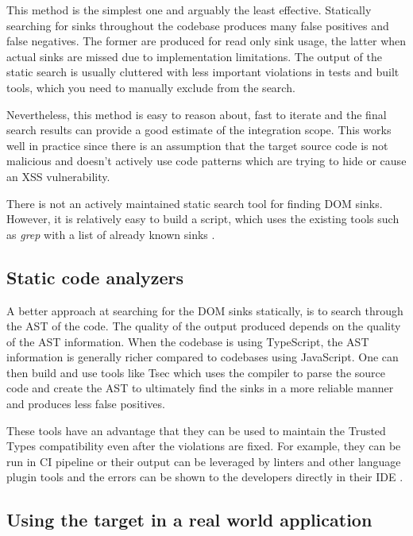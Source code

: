 This method is the simplest one and arguably the least effective. Statically searching for sinks
throughout the codebase produces many false positives and false negatives. The former are produced
for read only sink usage, the latter when actual sinks are missed due to implementation limitations.
The output of the static search is usually cluttered with less important violations in tests and
built tools, which you need to manually exclude from the search.

Nevertheless, this method is easy to reason about, fast to iterate and the final search results can
provide a good estimate of the integration scope. This works well in practice since there is an
assumption that the target source code is not malicious and doesn't actively use code patterns which
are trying to hide or cause an XSS vulnerability.

There is not an actively maintained static search tool for finding DOM sinks. However, it is
relatively easy to build a script, which uses the existing tools such as \textit{grep} with a list
of already known sinks \cite{xss_sink_finder}.

\subsection{Static code analyzers}

A better approach at searching for the DOM sinks statically, is to search through the AST of the
code. The quality of the output produced depends on the quality of the AST information. When the
codebase is using TypeScript, the AST information is generally richer compared to codebases using
JavaScript. One can then build and use tools like Tsec \cite{tsec_github} which uses the compiler to
parse the source code and create the AST to ultimately find the sinks in a more reliable manner and
produces less false positives.

These tools have an advantage that they can be used to maintain the Trusted Types compatibility even
after the violations are fixed. For example, they can be run in CI pipeline or their output can be
leveraged by linters and other language plugin tools and the errors can be shown to the developers
directly in their IDE \cite{tsec_lsp}.

\subsection{Using the target in a real world application}

